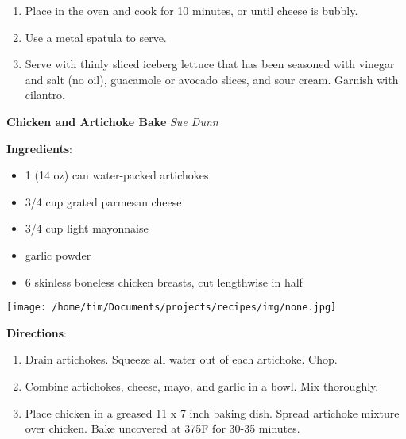 \documentclass[11pt, twoside, openany]{book}
\begin{document}
\begin{minipage}[t]{\linewidth}
\begin{enumerate}
\item Place in the oven and cook for 10 minutes, or until cheese is bubbly.
\item Use a metal spatula to serve.
\item Serve with thinly sliced iceberg lettuce that has been seasoned with vinegar and salt (no oil), guacamole or avocado slices, and sour cream. Garnish with cilantro.
\end{enumerate}
\end{minipage}\vspace{8mm}
\noindent\begin{minipage}[t]{\linewidth}%
{\Large\textbf{Chicken and Artichoke Bake}} \label{chicken-and-artichoke-bake}\hfill\textit{Sue Dunn}\\
\noindent\begin{minipage}[t]{0.78\linewidth}%
\textbf{Ingredients}:\vspace{-3mm}
\begin{multicols}{2}
\begin{itemize}\setlength\itemsep{-1mm}
\item 1 (14 oz) can water-packed artichokes
\item 3/4 cup grated parmesan cheese
\item 3/4 cup light mayonnaise
\item garlic powder
\item 6 skinless boneless chicken breasts, cut lengthwise in half
\end{itemize}
\end{multicols}
\end{minipage}
\noindent\begin{minipage}[t]{0.18\linewidth}
\centering \strut\vspace*{-\baselineskip}\newline
\texttt{[image: /home/tim/Documents/projects/recipes/img/none.jpg]}\\
\end{minipage}\vspace{3mm}
\textbf{Directions}:
\vspace{-3mm}\begin{enumerate}\setlength\itemsep{-1mm}
\item Drain artichokes. Squeeze all water out of each artichoke. Chop.
\item Combine artichokes, cheese, mayo, and garlic in a bowl. Mix thoroughly.
\item Place chicken in a greased 11 x 7 inch baking dish. Spread artichoke mixture over chicken. Bake uncovered at 375F for 30-35 minutes.
\end{enumerate}
\end{minipage}\vspace{8mm}
\end{document}
